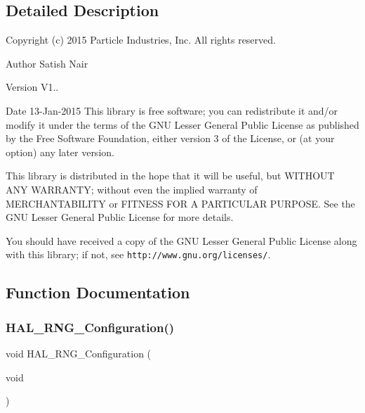 \subsection{Detailed Description}
Copyright (c) 2015 Particle Industries, Inc. All rights reserved. 

\begin{DoxyAuthor}{Author}
Satish Nair 
\end{DoxyAuthor}
\begin{DoxyVersion}{Version}
V1.. 
\end{DoxyVersion}
\begin{DoxyDate}{Date}
13-\/\+Jan-\/2015 This library is free software; you can redistribute it and/or modify it under the terms of the G\+NU Lesser General Public License as published by the Free Software Foundation, either version 3 of the License, or (at your option) any later version.
\end{DoxyDate}
This library is distributed in the hope that it will be useful, but W\+I\+T\+H\+O\+UT A\+NY W\+A\+R\+R\+A\+N\+TY; without even the implied warranty of M\+E\+R\+C\+H\+A\+N\+T\+A\+B\+I\+L\+I\+TY or F\+I\+T\+N\+E\+SS F\+OR A P\+A\+R\+T\+I\+C\+U\+L\+AR P\+U\+R\+P\+O\+SE. See the G\+NU Lesser General Public License for more details.

You should have received a copy of the G\+NU Lesser General Public License along with this library; if not, see {\tt http\+://www.\+gnu.\+org/licenses/}. 

\subsection{Function Documentation}
\mbox{\label{rng__hal_8h_a5789cde5621c72ba09128cc7f0d84531}} 
\subsubsection{H\+A\+L\+\_\+\+R\+N\+G\+\_\+\+Configuration()}
{\footnotesize\ttfamily void H\+A\+L\+\_\+\+R\+N\+G\+\_\+\+Configuration (\begin{DoxyParamCaption}\item[{void}]{ }\end{DoxyParamCaption})}

\mbox{\label{rng__hal_8h_abd7eeb850453afdae1e6ac00ecdae295}} 

